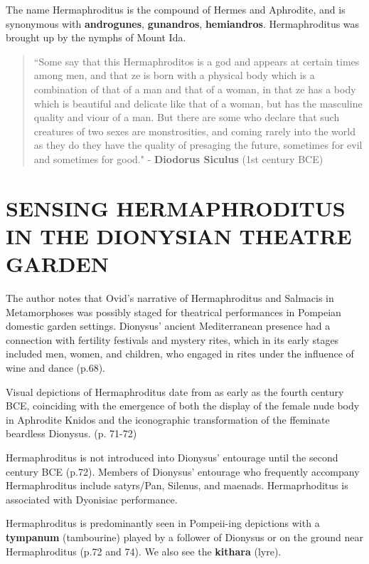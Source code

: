 The name Hermaphroditus is the compound of Hermes and Aphrodite, and is synonymous with \textbf{androgunes}, \textbf{gunandros}, \textbf{hemiandros}. Hermaphroditus was brought up by the nymphs of Mount Ida.


\begin{quotation}
    ``Some say that this Hermaphroditos is a god and appears at certain times among men, and that ze is born with a physical body which is a combination of that of a man and that of a woman, in that ze has a body which is beautiful and delicate like that of a woman, but has the masculine quality and viour of a man. But there are some who declare that such creatures of two sexes are monstrosities, and coming rarely into the world as they do they have the quality of presaging the future, sometimes for evil and sometimes for good." - \textbf{Diodorus Siculus} (1st century BCE)
\end{quotation}



\section{SENSING HERMAPHRODITUS IN THE DIONYSIAN THEATRE GARDEN}

The author notes that Ovid's narrative of Hermaphroditus and Salmacis in Metamorphoses was possibly staged for theatrical performances in Pompeian domestic garden settings. Dionysus' ancient Mediterranean presence had a connection with fertility festivals and mystery rites, which in its early stages included men, women, and children, who engaged in rites under the influence of wine and dance (p.68).

\begin{rmk}
    Visual depictions of Hermaphroditus date from as early as the fourth century BCE, coinciding with the emergence of both the display of the female nude body in Aphrodite Knidos and the iconographic transformation of the ffeminate beardless Dionysus. (p. 71-72)
\end{rmk}

Hermaphroditus is not introduced into Dionysus' entourage until the second century BCE (p.72). Members of Dionysus' entourage who frequently accompany Hermaphroditus include satyrs/Pan, Silenus, and maenads. Hermaprhoditus is associated with Dyonisiac performance.

Hermaphroditus is predominantly seen in Pompeii-ing depictions with a \textbf{tympanum} (tambourine) played by a follower of Dionysus or on the ground near Hermaphroditus (p.72 and 74). We also see the \textbf{kithara} (lyre).

